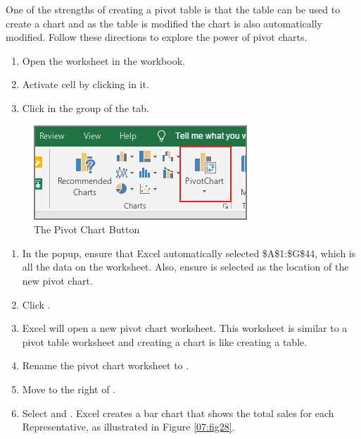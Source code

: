 One of the strengths of creating a pivot table is that the table can be used to create a chart and as the table is modified the chart is also automatically modified. Follow these directions to explore the power of pivot charts.

\begin{enumerate}
	\item Open the  worksheet in the  workbook.
	\item Activate cell  by clicking in it.  
	\item Click  in the  group of the  tab.
\end{enumerate}

\begin{figure}[H]
	\centering
	\includegraphics[width=\maxwidth{.95\linewidth}]{gfx/ch07_fig27}
	\caption{The Pivot Chart Button}
	\label{07:fig27}
\end{figure}

\begin{enumerate}[resume]	
	\item In the  popup, ensure that Excel automatically selected \$A\$1:\$G\$44, which is all the data on the worksheet. Also, ensure  is selected as the location of the new pivot chart.
	\item Click .
	\item Excel will open a new pivot chart worksheet. This worksheet is similar to a pivot table worksheet and creating a chart is like creating a table.
	\item Rename the pivot chart worksheet to . 
	\item Move  to the right of .
	\item Select  and . Excel creates a bar chart that shows the total sales for each Representative, as illustrated in Figure \ref{07:fig28}.
\end{enumerate}	

